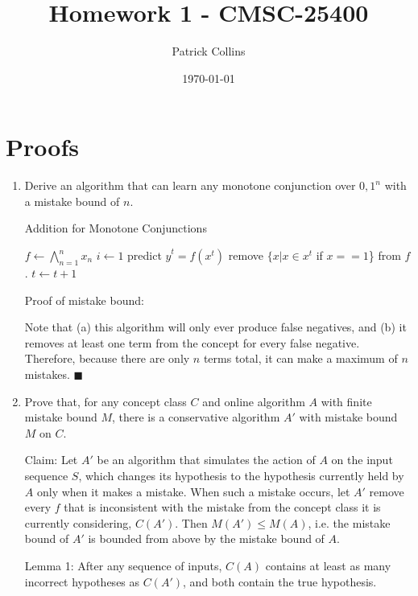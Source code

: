 \documentclass{article}
\begin{document}
\title{Homework 1 - CMSC-25400}
\author{Patrick Collins}
\date{\today}
\maketitle

\section{Proofs}
\begin{enumerate}
\item Derive an algorithm that can learn any monotone conjunction over
  ${0, 1}^n$ with a mistake bound of $n$. \\

\begin{algorithm}
\caption{Addition for Monotone Conjunctions}
\begin{algorithmic}[1]
\State $f \gets \bigwedge\limits_{n=1}^n x_n$
\State $i \gets 1$
\State predict $\hat{y}^t = f(x^t)$
\State remove $\{x | x \in x^t$ if $x == 1$\} from $f$.
\EndIf
\State $t \gets t + 1$
\EndWhile
\end{algorithmic}
\end{algorithm}

Proof of mistake bound:

Note that (a) this algorithm will only ever produce false
negatives, and (b) it removes at least one term from the
concept for every false negative. Therefore, because there are only
$n$ terms total, it can make a maximum of $n$ mistakes. $\blacksquare$

\item Prove that, for any concept class $C$ and online algorithm $A$
  with finite mistake bound $M$, there is a conservative algorithm
  $A'$ with mistake bound $M$ on $C$. 


Claim: Let $A'$ be an algorithm that simulates the action of $A$ on the input
sequence $S$, which changes its hypothesis to the hypothesis currently
held by $A$ only when it makes a mistake. When such a mistake occurs,
let $A'$ remove every $f$ that is inconsistent with the mistake from
the concept class it is currently considering, $C(A')$. Then $M(A') \leq
M(A)$, i.e. the mistake bound of $A'$ is bounded from above by the mistake bound of $A$. 

Lemma 1: After any sequence of inputs, $C(A)$ contains at least as many
incorrect hypotheses as $C(A')$, and both contain the true hypothesis.


\end{enumerate}
\end{document}
